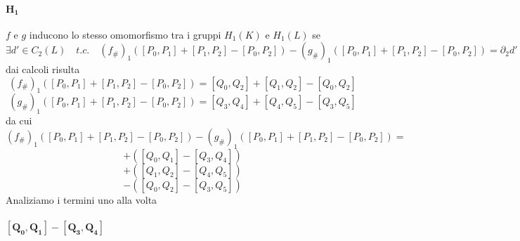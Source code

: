 \documentclass[a4paper]{report}
\begin{document}
\paragraph{$\mathbf{H_1}$} $f$ e $g$ inducono lo stesso omomorfismo tra i gruppi $H_1(K)$ e $H_1(L)$ se
\[
    \exists d'\in C_2(L)\quad t.c.\quad (f_\#)_1([P_0,P_1]+[P_1,P_2]-[P_0,P_2])-(g_\#)_1([P_0,P_1]+[P_1,P_2]-[P_0,P_2])=\partial_2d'
\]
dai calcoli risulta
\[
    (f_\#)_1([P_0,P_1]+[P_1,P_2]-[P_0,P_2])=[Q_0,Q_2]+[Q_1,Q_2]-[Q_0,Q_2]
\]
\[
    (g_\#)_1([P_0,P_1]+[P_1,P_2]-[P_0,P_2])=[Q_3,Q_4]+[Q_4,Q_5]-[Q_3,Q_5]
\]
da cui
\[
    (f_\#)_1([P_0,P_1]+[P_1,P_2]-[P_0,P_2])-(g_\#)_1([P_0,P_1]+[P_1,P_2]-[P_0,P_2])=
\]
\[
    +([Q_0,Q_1]-[Q_3,Q_4])  
\]
\[
    +([Q_1,Q_2]-[Q_4,Q_5])    
\]
\[
    -([Q_0,Q_2]-[Q_3,Q_5])    
\]
Analiziamo i termini uno alla volta
\paragraph{$\mathbf{[Q_0,Q_1]-[Q_3,Q_4]}$}
\end{document}
